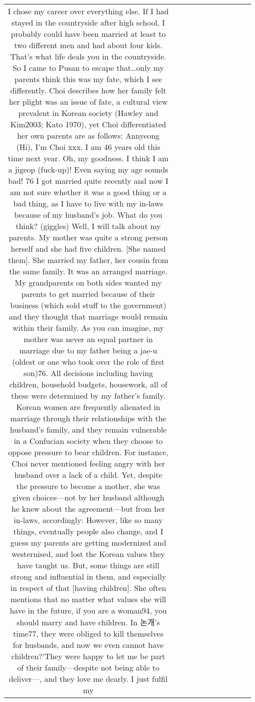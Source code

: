 \begin{table}[h!]
\begin{tabular}{|c|c|c|c|c|c|c|c|c|c|c|}
{I chose my career over everything else. If I had stayed in the countryside after high school, I probably could have been married at least to two different men and had about four kids. That’s what life deals you in the countryside. So I came to Pusan to escape that…only my parents think this was my fate, which I see differently.
Choi describes how her family felt her plight was an issue of fate, a cultural view prevalent in Korean society (Hawley and Kim2003; Kato 1970), yet Choi differentiated her own parents are as follows:
Annyeong (Hi), I'm Choi xxx. I am 46 years old this time next year. Oh, my
goodness. I think I am a jigeop (fuck-up)! Even saying my age sounds bad! 76 I got
married quite recently and now I am not sure whether it was a good thing or a bad
thing, as I have to live with my in-laws because of my husband’s job. What do you
think? (giggles)
Well, I will talk about my parents. My mother was quite a strong person herself and
she had five children. [She named them]. She married my father, her cousin from
the same family. It was an arranged marriage. My grandparents on both sides
wanted my parents to get married because of their business (which sold stuff to the
government) and they thought that marriage would remain within their family. As
you can imagine, my mother was never an equal partner in marriage due to my
father being a jae-u (oldest or one who took over the role of first son)76. All
decisions including having children, household budgets, housework, all of these
were determined by my father’s family.
Korean women are frequently alienated in marriage through their relationships with the husband’s family, and they remain vulnerable in a Confucian society when they choose to oppose pressure to bear children. For instance, Choi never mentioned feeling angry with her husband over a lack of a child. Yet, despite the pressure to become a mother, she was given choices—not by her husband although he knew about the agreement—but from her in-laws, accordingly:
However, like so many things, eventually people also change, and I guess my
parents are getting modernized and westernised, and lost the Korean values they
have taught us. But, some things are still strong and influential in them, and
especially in respect of that [having children]. She often mentions that no matter
what values she will have in the future, if you are a woman94, you should marry and
have children. In 논개's time77, they were obliged to kill themselves for husbands,
and now we even cannot have children?’They were happy to let me be part of their
family—despite not being able to deliver—, and they love me dearly. I just fulfil my
}
\end{tabular}
\end{table}
